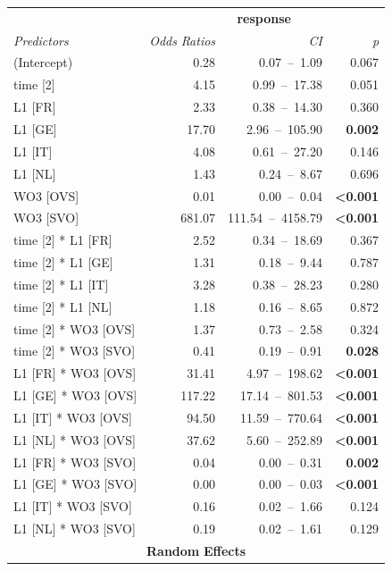 \begin{table}
    \begin{tabularx}{\textwidth}{Xrrr}
    \lsptoprule
    \textbf{~} & \multicolumn{3}{c}{ \textbf{response}}\\
    \textit{Predictors} & \textit{Odds} \textit{Ratios} & \textit{CI} & \textit{p}\\
    \midrule
    (Intercept) & 0.28 & 0.07~–~1.09 & 0.067\\
    time [2] & 4.15 & 0.99~–~17.38 & 0.051\\
    L1 [FR] & 2.33 & 0.38~–~14.30 & 0.360\\
    L1 [GE] & 17.70 & 2.96~–~105.90 & \textbf{0.002}\\
    L1 [IT] & 4.08 & 0.61~–~27.20 & 0.146\\
    L1 [NL] & 1.43 & 0.24~–~8.67 & 0.696\\
    WO3 [OVS] & 0.01 & 0.00~–~0.04 & \textbf{<0.001}\\
    WO3 [SVO] & 681.07 & 111.54~–~4158.79 & \textbf{<0.001}\\
    time [2] * L1 [FR] & 2.52 & 0.34~–~18.69 & 0.367\\
    time [2] * L1 [GE] & 1.31 & 0.18~–~9.44 & 0.787\\
    time [2] * L1 [IT] & 3.28 & 0.38~–~28.23 & 0.280\\
    time [2] * L1 [NL] & 1.18 & 0.16~–~8.65 & 0.872\\
    time [2] * WO3 [OVS] & 1.37 & 0.73~–~2.58 & 0.324\\
    time [2] * WO3 [SVO] & 0.41 & 0.19~–~0.91 & \textbf{0.028}\\
    L1 [FR] * WO3 [OVS] & 31.41 & 4.97~–~198.62 & \textbf{<0.001}\\
    L1 [GE] * WO3 [OVS] & 117.22 & 17.14~–~801.53 & \textbf{<0.001}\\
    L1 [IT] * WO3 [OVS] & 94.50 & 11.59~–~770.64 & \textbf{<0.001}\\
    L1 [NL] * WO3 [OVS] & 37.62 & 5.60~–~252.89 & \textbf{<0.001}\\
    L1 [FR] * WO3 [SVO] & 0.04 & 0.00~–~0.31 & \textbf{0.002}\\
    L1 [GE] * WO3 [SVO] & 0.00 & 0.00~–~0.03 & \textbf{<0.001}\\
    L1 [IT] * WO3 [SVO] & 0.16 & 0.02~–~1.66 & 0.124\\
    L1 [NL] * WO3 [SVO] & 0.19 & 0.02~–~1.61 & 0.129\\
    \multicolumn{4}{c}{\textbf{Random} \textbf{Effects}}\\

\end{tabularx}
\end{table}
